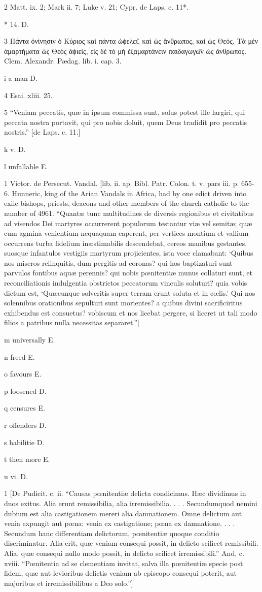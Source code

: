2
Matt. ix. 2; Mark ii. 7; Luke v. 21; Cypr. de Laps. c. 11*.

*
14. D.

3
Πάντα ὀνίνησιν ὁ Κύριος καὶ πάντα ὠϕελει̑, καὶ ὡς ἄνθρωπος, καὶ ὡς Θεός. Τὰ μὲν ἁμαρτήματα ὡς Θεὸς ἀϕιεὶς, εἰς δὲ τὸ μὴ ἐξαμαρτάνειν παιδαγωγω̑ν ὡς ἄνθρωπος. Clem. Alexandr. Pædag. lib. i. cap. 3.

i
a man D.

4
Esai. xliii. 25.

5
“Veniam peccatis, quæ in ipsum commissa sunt, solus potest ille largiri, qui peccata nostra portavit, qui pro nobis doluit, quem Deus tradidit pro peccatis nostris.” [de Laps. c. 11.]

k
v. D.

l
unfallable E.

1
Victor. de Persecut. Vandal. [lib. ii. ap. Bibl. Patr. Colon. t. v. pars iii. p. 655-6. Hunneric, king of the Arian Vandals in Africa, had by one edict driven into exile bishops, priests, deacons and other members of the church catholic to the number of 4961. “Quantæ tunc multitudines de diversis regionibus et civitatibus ad visendos Dei martyres occurrerent populorum testantur viæ vel semitæ; quæ cum agmina venientium nequaquam caperent, per vertices montium et vallium occurrens turba fidelium inæstimabilis descendebat, cereos manibus gestantes, suosque infantulos vestigiis martyrum projicientes, ista voce clamabant: ‘Quibus nos miseros relinquitis, dum pergitis ad coronas? qui hos baptizaturi sunt parvulos fontibus aquæ perennis? qui nobis pœnitentiæ munus collaturi sunt, et reconciliationis indulgentia obstrictos peccatorum vinculis soluturi? quia vobis dictum est, ‘Quæcunque solveritis super terram erunt soluta et in cœlis.’ Qui nos solennibus orationibus sepulturi sunt morientes? a quibus divini sacrificiritus exhibendus est consuetus? vobiscum et nos licebat pergere, si liceret ut tali modo filios a patribus nulla necessitas separaret.”]

m
universally E.

n
freed E.

o
favours E.

p
loosened D.

q
censures E.

r
offenders D.

s
habilitie D.

t
then more E.

u
vi. D.

1
[De Pudicit. c. ii. “Causas pœnitentiæ delicta condicimus. Hæc dividimus in duos exitus. Alia erunt remissibilia, alia irremissibilia. . . . Secundumquod nemini dubium est alia castigationem mereri alia damnationem. Omne delictum aut venia expungit aut pœna: venia ex castigatione; pœna ex damnatione. . . . Secundum hanc differentiam delictorum, pœnitentiæ quoque conditio discriminatur. Alia erit, quæ veniam consequi possit, in delicto scilicet remissibili. Alia, quæ consequi nullo modo possit, in delicto scilicet irremissibili.” And, c. xviii. “Pœnitentia ad se clementiam invitat, salva illa pœnitentiæ specie post fidem, quæ aut levioribus delictis veniam ab episcopo consequi poterit, aut majoribus et irremissibilibus a Deo solo.”]


